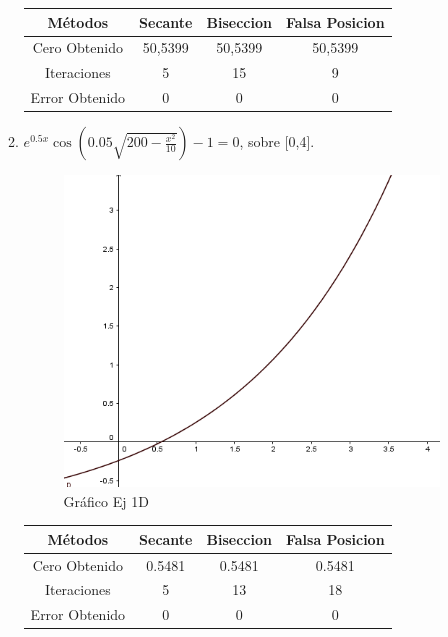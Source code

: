 \documentclass{udpreport}
\begin{document}
\begin{enumerate}
\begin{enumerate}
\begin{table}[H]
\begin{tabular} { |c|c|c|c|}
                \hline
                Métodos       & Secante & Biseccion & Falsa Posicion  \\
                \hline
                Cero Obtenido &  50,5399       &    50,5399       &      50,5399          \\
                \hline
                Iteraciones   &     5        &      15     &        9        \\
                \hline
                Error Obtenido &    0       &       0       &       0   \\
                \hline 
                
                \end{tabular}
            \end{table}
    \newpage
    
    \item \(e^{0.5x}\cos(0.05\sqrt{200-\frac{x^2}{10}}) -1 = 0 \), sobre [0,4].\\
        
        \begin{figure}[H]
        \centering
        \includegraphics[width=10cm]{GraficoEj1d}
        \caption{Gráfico Ej 1D}
        \end{figure}
        \begin{table}[H]
        \centering
            \begin{tabular} { |c|c|c|c|}
            
            \hline
            Métodos       & Secante & Biseccion & Falsa Posicion \\
            \hline
            Cero Obtenido &  0.5481       &    0.5481       &      0.5481          \\
            \hline
            Iteraciones   &     5        &      13     &        18       \\
            \hline
            Error Obtenido   &  0 & 0 & 0 \\
            \hline
            

\end{tabular}
\end{table}
\end{enumerate}
\end{enumerate}
\end{document}
